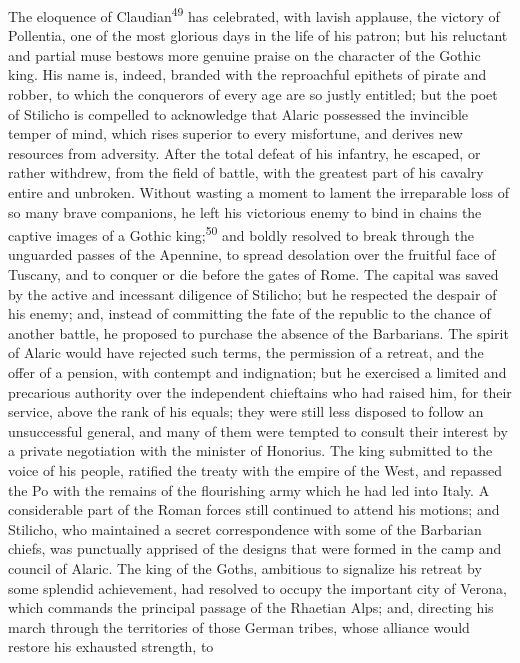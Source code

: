 The eloquence of Claudian\textsuperscript{49} has celebrated, with lavish
applause, the victory of Pollentia, one of the most glorious days
in the life of his patron; but his reluctant and partial muse
bestows more genuine praise on the character of the Gothic king.
His name is, indeed, branded with the reproachful epithets of
pirate and robber, to which the conquerors of every age are so
justly entitled; but the poet of Stilicho is compelled to
acknowledge that Alaric possessed the invincible temper of mind,
which rises superior to every misfortune, and derives new
resources from adversity. After the total defeat of his infantry,
he escaped, or rather withdrew, from the field of battle, with
the greatest part of his cavalry entire and unbroken. Without
wasting a moment to lament the irreparable loss of so many brave
companions, he left his victorious enemy to bind in chains the
captive images of a Gothic king;\textsuperscript{50} and boldly resolved to break
through the unguarded passes of the Apennine, to spread
desolation over the fruitful face of Tuscany, and to conquer or
die before the gates of Rome. The capital was saved by the active
and incessant diligence of Stilicho; but he respected the despair
of his enemy; and, instead of committing the fate of the republic
to the chance of another battle, he proposed to purchase the
absence of the Barbarians. The spirit of Alaric would have
rejected such terms, the permission of a retreat, and the offer
of a pension, with contempt and indignation; but he exercised a
limited and precarious authority over the independent chieftains
who had raised him, for their service, above the rank of his
equals; they were still less disposed to follow an unsuccessful
general, and many of them were tempted to consult their interest
by a private negotiation with the minister of Honorius. The king
submitted to the voice of his people, ratified the treaty with
the empire of the West, and repassed the Po with the remains of
the flourishing army which he had led into Italy. A considerable
part of the Roman forces still continued to attend his motions;
and Stilicho, who maintained a secret correspondence with some of
the Barbarian chiefs, was punctually apprised of the designs that
were formed in the camp and council of Alaric. The king of the
Goths, ambitious to signalize his retreat by some splendid
achievement, had resolved to occupy the important city of Verona,
which commands the principal passage of the Rhaetian Alps; and,
directing his march through the territories of those German
tribes, whose alliance would restore his exhausted strength, to
